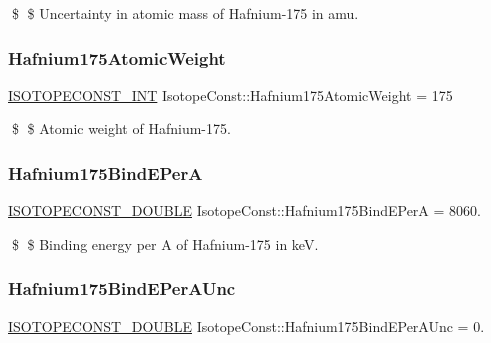 \$ \$ Uncertainty in atomic mass of Hafnium-\/175 in amu. \mbox{\label{group___isotope_const-_hafnium-_hf175_gaa6ff95553199011800c301b69f704ac4}} 
\subsubsection{\texorpdfstring{Hafnium175\+Atomic\+Weight}{Hafnium175AtomicWeight}}
{\footnotesize\ttfamily \mbox{\hyperlink{group___isotope_const-_macros_ga5f18360b3e99483a35c32d789e62621c}{I\+S\+O\+T\+O\+P\+E\+C\+O\+N\+S\+T\+\_\+\+I\+NT}} Isotope\+Const\+::\+Hafnium175\+Atomic\+Weight = 175}

\$ \$ Atomic weight of Hafnium-\/175. \mbox{\label{group___isotope_const-_hafnium-_hf175_ga51483f9cade15e172a97b839c3d25cb7}} 
\subsubsection{\texorpdfstring{Hafnium175\+Bind\+E\+PerA}{Hafnium175BindEPerA}}
{\footnotesize\ttfamily \mbox{\hyperlink{group___isotope_const-_macros_ga8f45a7272ce02c0b4c65c44636ed719a}{I\+S\+O\+T\+O\+P\+E\+C\+O\+N\+S\+T\+\_\+\+D\+O\+U\+B\+LE}} Isotope\+Const\+::\+Hafnium175\+Bind\+E\+PerA = 8060.}

\$ \$ Binding energy per A of Hafnium-\/175 in keV. \mbox{\label{group___isotope_const-_hafnium-_hf175_gab0144dd5a474c86a7504efe9d6251f77}} 
\subsubsection{\texorpdfstring{Hafnium175\+Bind\+E\+Per\+A\+Unc}{Hafnium175BindEPerAUnc}}
{\footnotesize\ttfamily \mbox{\hyperlink{group___isotope_const-_macros_ga8f45a7272ce02c0b4c65c44636ed719a}{I\+S\+O\+T\+O\+P\+E\+C\+O\+N\+S\+T\+\_\+\+D\+O\+U\+B\+LE}} Isotope\+Const\+::\+Hafnium175\+Bind\+E\+Per\+A\+Unc = 0.}

